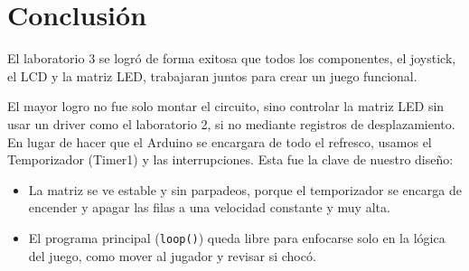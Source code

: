 \section{Conclusión}
El laboratorio 3 se logró de forma exitosa que todos los componentes, el joystick, el LCD y la matriz LED, trabajaran juntos para crear un juego funcional.

El mayor logro no fue solo montar el circuito, sino controlar la matriz LED sin usar un driver como el laboratorio 2, si no mediante  registros de desplazamiento. En lugar de hacer que el Arduino se encargara de todo el refresco, usamos el Temporizador (Timer1) y las interrupciones.  Esta fue la clave de nuestro diseño:
\begin{itemize}
    \item La matriz se ve estable y sin parpadeos, porque el temporizador se encarga de encender y apagar las filas a una velocidad constante y muy alta.
        \item El programa principal (\texttt{loop()}) queda libre para enfocarse solo en la lógica del juego, como mover al jugador y revisar si chocó.
        \end{itemize}


